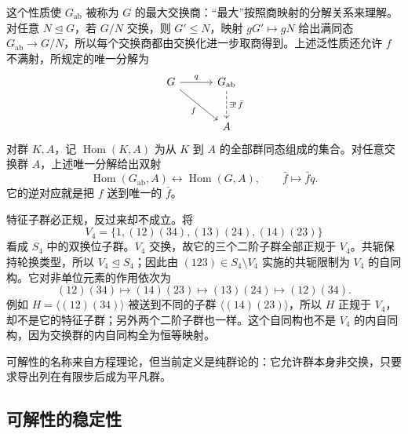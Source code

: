 这个性质使 \(G_{\mathrm{ab}}\) 被称为 \(G\) 的最大交换商：“最大”按照商映射的分解关系来理解。对任意 \(N\trianglelefteq G\)，若 \(G/N\) 交换，则 \(G'\le N\)，映射 \(gG'\mapsto gN\) 给出满同态 \(G_{\mathrm{ab}}\rightarrow G/N\)，所以每个交换商都由交换化进一步取商得到。上述泛性质还允许 \(f\) 不满射，所规定的唯一分解为
\[
	\begin{tikzcd}[column sep=3em,row sep=2.5em]
		G\arrow[r,"q"]\arrow[dr,"f"']&G_{\mathrm{ab}}\arrow[d,dashed,"\exists!\,\bar f"]\\
		&A
	\end{tikzcd}
\]
对群 \(K,A\)，记 \(\operatorname{Hom}(K,A)\) 为从 \(K\) 到 \(A\) 的全部群同态组成的集合。对任意交换群 \(A\)，上述唯一分解给出双射
\[
	\operatorname{Hom}(G_{\mathrm{ab}},A) \longleftrightarrow\operatorname{Hom}(G,A), \qquad \bar f\longmapsto\bar f q.
\]
它的逆对应就是把 \(f\) 送到唯一的 \(\bar f\)。

\ProseParagraphBreak
特征子群必正规，反过来却不成立。将
\[
	V_4=\bigl\{1,(12)(34),(13)(24),(14)(23)\bigr\}
\]
看成 \(S_4\) 中的双换位子群。\(V_4\) 交换，故它的三个二阶子群全部正规于 \(V_4\)。共轭保持轮换类型，所以 \(V_4\trianglelefteq S_4\)；因此由 \((123)\in S_4\setminus V_4\) 实施的共轭限制为 \(V_4\) 的自同构。它对非单位元素的作用依次为
\[
	(12)(34)\longmapsto(14)(23)\longmapsto(13)(24)\longmapsto(12)(34).
\]
例如 \(H=\langle(12)(34)\rangle\) 被送到不同的子群 \(\langle(14)(23)\rangle\)，所以 \(H\) 正规于 \(V_4\)，却不是它的特征子群；另外两个二阶子群也一样。这个自同构也不是 \(V_4\) 的内自同构，因为交换群的内自同构全为恒等映射。

\ProseParagraphBreak
可解性的名称来自方程理论，但当前定义是纯群论的：它允许群本身非交换，只要求导出列在有限步后成为平凡群。

\subsection{可解性的稳定性}
\label{b1:subsec:0702:02}


